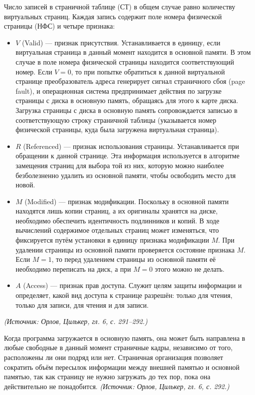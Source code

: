 \documentclass[a4paper,12pt]{article}
\begin{document}
Число записей в страничной таблице (СТ) в общем случае равно количеству виртуальных страниц. Каждая запись содержит поле номера физической страницы (НФС) и четыре признака:
\begin{itemize}
\item \(V\) (Valid) --- признак присутствия. Устанавливается в единицу, если виртуальная страница в данный момент находится в основной памяти. В этом случае в поле номера физической страницы находится соответствующий номер. Если \(V=0\), то при попытке обратиться к данной виртуальной странице преобразователь адреса генерирует сигнал страничного сбоя (page fault), и операционная система предпринимает действия по загрузке страницы с диска в основную память, обращаясь для этого к карте диска. Загрузка страницы с диска в основную память сопровождается записью в соответствующую строку страничной таблицы (указывается номер физической страницы, куда была загружена виртуальная страница).
\item \(R\) (Referenced) --- признак использования страницы. Устанавливается при обращении к данной странице. Эта информация используется в алгоритме замещения страниц для выбора той из них, которую можно наиболее безболезненно удалить из основной памяти, чтобы освободить место для новой.
\item \(M\) (Modified) --- признак модификации. Поскольку в основной памяти находятся лишь копии страниц, а их оригиналы хранятся на диске, необходимо обеспечить идентичность подлинников и копий. В ходе вычислений содержимое отдельных страниц может изменяться, что фиксируется путём установки в единицу признака модификации \(M\). При удалении страницы из основной памяти проверяется состояние признака \(M\). Если \(M=1\), то перед удалением страницы из основной памяти её необходимо переписать на диск, а при \(M=0\) этого можно не делать.
\item \(A\) (Access) --- признак прав доступа. Служит целям защиты информации и определяет, какой вид доступа к странице разрешён: только для чтения, только для записи, для чтения и для записи.
\end{itemize}
\textit{(Источник: Орлов, Цилькер, гл. 6, с. 291--292.)}

Когда программа загружается в основную память, она может быть направлена в любые свободные в данный момент страничные кадры, независимо от того, расположены ли они подряд или нет. Страничная организация позволяет сократить объём пересылок информации между внешней памятью и основной памятью, так как страницу не нужно загружать до тех пор, пока она действительно не понадобится.
\textit{(Источник: Орлов, Цилькер, гл. 6, с. 292.)}
\end{document}
